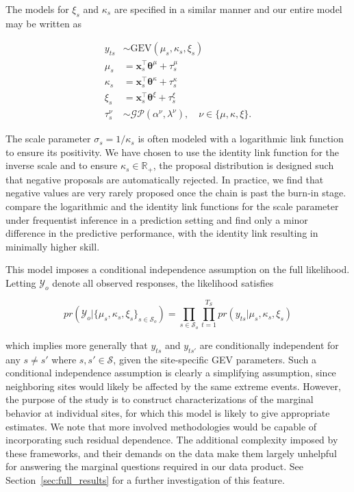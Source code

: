 \documentclass[11pt,english]{article}
\newcommand{\bs}[1]{\boldsymbol{#1}}
\newcommand{\real}{\mathbb{R}}
\newcommand{\bl}{\begin{linenomath}}
\newcommand{\el}{\end{linenomath}}
\begin{document}
The models for $\xi_s$ and $\kappa_s$ are specified in a similar manner and our entire model may be written as
\bl\begin{align}\label{eq:full model}
y_{ts} &\sim \text{GEV}(\mu_s,\kappa_s,\xi_s) \nonumber \\
\mu_s &=  \bs{x}_s^\top \bs{\theta}^{\mu} + \tau^{\mu}_s\nonumber \\
\kappa_s &=  \bs{x}_s^\top \bs{\theta}^{\kappa} + \tau_s^{\kappa} \\
\xi_s &=  \bs{x}_s^\top \bs{\theta}^{\xi} + \tau_s^{\xi} \nonumber \\
\tau_s^{\nu} &\sim \mathcal{G}\mathcal{P}(\alpha^\nu,\lambda^\nu), \quad \nu \in \{ \mu, \kappa, \xi \}. \nonumber 
\end{align}\el 
The scale parameter $\sigma_s = 1/\kappa_s$ is often modeled with a logarithmic link function to ensure its positivity. We have chosen to use the identity link function for the inverse scale and to ensure $\kappa_s \in \real_+$, the proposal distribution is designed such that negative proposals are automatically rejected. In practice, we find that negative values are very rarely proposed once the chain is past the burn-in stage.  \cite{FriederichsThorarinsdottir2012} compare the logarithmic and the identity link functions for the scale parameter under frequentist inference in a prediction setting and find only a minor difference in the predictive performance, with the identity link resulting in minimally higher skill. 

This model imposes a conditional independence assumption on the full likelihood. Letting $\mathcal{Y}_o$ denote all observed responses, the likelihood satisfies
\bl $$
pr(\mathcal{Y}_o|\{\mu_s,\kappa_s,\xi_s\}_{s\in\mathcal{S}_o}) = \prod_{s\in\mathcal{S}_o}\prod_{t = 1}^{T_S} pr(y_{ts}|\mu_s,\kappa_s,\xi_s)
$$\el
which implies more generally that $y_{ts}$ and $y_{ts'}$ are conditionally independent for any $s\neq s'$ where $s,s' \in \mathcal{S}$, given the site-specific GEV parameters.  Such a conditional independence assumption is clearly a simplifying assumption, since neighboring sites would likely be affected by the same extreme events.  However, the purpose of the study is to construct characterizations of the marginal behavior at individual sites, for which this model is likely to give appropriate estimates.  We note that more involved methodologies \citep[see e.g.][among others]{SangandGelfand2009, ribatet_et_2012, GhoshandMallick2011} would be capable of incorporating such residual dependence.  The additional complexity imposed by these frameworks, and their demands on the data make them largely unhelpful for answering the marginal questions required in our data product. See Section~\ref{sec:full_results} for a further investigation of this feature.
\end{document}
